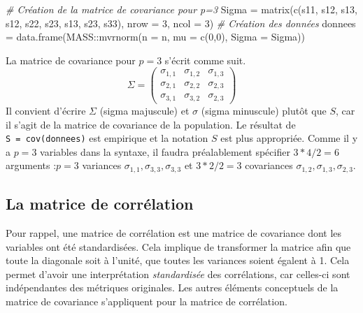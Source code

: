 \documentclass[
]{book}
\newenvironment{Shaded}{}{}
\newcommand{\AttributeTok}[1]{#1}
\newcommand{\CommentTok}[1]{\textit{#1}}
\newcommand{\DecValTok}[1]{#1}
\newcommand{\FunctionTok}[1]{#1}
\newcommand{\NormalTok}[1]{#1}
\newcommand{\OtherTok}[1]{#1}
\newcommand{\SpecialCharTok}[1]{#1}
\begin{document}
\begin{Shaded}
\begin{Highlighting}[]
\CommentTok{\# Création de la matrice de covariance pour p=3}
\NormalTok{Sigma }\OtherTok{=} \FunctionTok{matrix}\NormalTok{(}\FunctionTok{c}\NormalTok{(s11, s12, s13,}
\NormalTok{                 s12, s22, s23,}
\NormalTok{                 s13, s23, s33), }\AttributeTok{nrow =} \DecValTok{3}\NormalTok{, }\AttributeTok{ncol =} \DecValTok{3}\NormalTok{)}
\CommentTok{\# Création des données }
\NormalTok{donnees }\OtherTok{=} \FunctionTok{data.frame}\NormalTok{(MASS}\SpecialCharTok{::}\FunctionTok{mvrnorm}\NormalTok{(}\AttributeTok{n =}\NormalTok{ n, }\AttributeTok{mu =} \FunctionTok{c}\NormalTok{(}\DecValTok{0}\NormalTok{,}\DecValTok{0}\NormalTok{), }\AttributeTok{Sigma =}\NormalTok{ Sigma))}
\end{Highlighting}
\end{Shaded}

La matrice de covariance pour \(p=3\) s'écrit comme suit.
\[
\Sigma = \left( 
\begin{array}{ccc}
\sigma_{1,1} & \sigma_{1,2} & \sigma_{1,3}\\
\sigma_{2,1} & \sigma_{2,2} & \sigma_{2,3}\\
\sigma_{3,1} & \sigma_{3,2} & \sigma_{2,3}
\end{array}
\right)
\]
Il convient d'écrire \(\Sigma\) (sigma majuscule) et \(\sigma\) (sigma minuscule) plutôt que \(S\), car il s'agit de la matrice de covariance de la population. Le résultat de \texttt{S\ =\ cov(donnees)} est empirique et la notation \(S\) est plus appropriée. Comme il y a \(p=3\) variables dans la syntaxe, il faudra préalablement spécifier \(3*4/2 = 6\) arguments :\(p = 3\) variances \(\sigma_{1,1},\sigma_{3,3},\sigma_{3,3}\) et \(3*2/2 =3\) covariances \(\sigma_{1,2},\sigma_{1,3},\sigma_{2,3}\).

\hypertarget{la-matrice-de-corruxe9lation}{%
\subsection{La matrice de corrélation}\label{la-matrice-de-corruxe9lation}}

Pour rappel, une matrice de corrélation est une matrice de covariance dont les variables ont été standardisées. Cela implique de transformer la matrice afin que toute la diagonale soit à l'unité, que toutes les variances soient égalent à 1. Cela permet d'avoir une interprétation \emph{standardisée} des corrélations, car celles-ci sont indépendantes des métriques originales. Les autres éléments conceptuels de la matrice de covariance s'appliquent pour la matrice de corrélation.
\end{document}
